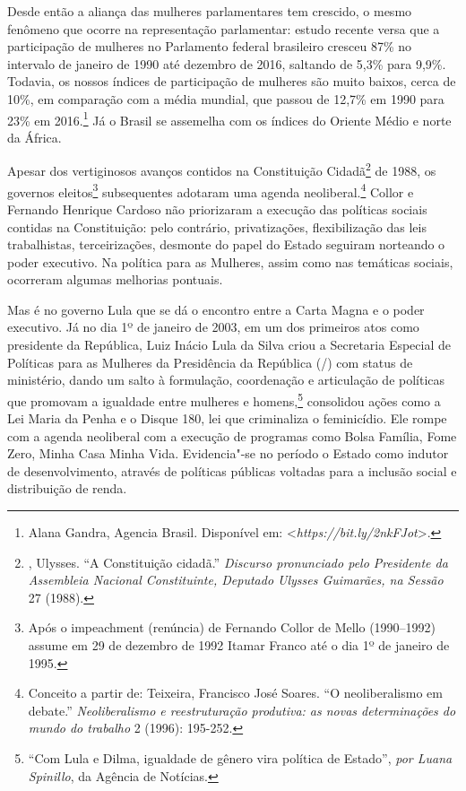 Desde então a aliança das mulheres parlamentares tem crescido, o mesmo
fenômeno que ocorre na representação parlamentar: estudo recente versa que a
participação de mulheres no Parlamento federal brasileiro cresceu 87\%
no intervalo de janeiro de 1990 até dezembro de 2016, saltando de 5,3\%
para 9,9\%. Todavia, os nossos índices de participação de mulheres são
muito baixos, cerca de 10\%, em comparação com a média mundial, que
passou de 12,7\% em 1990 para 23\% em 2016.\footnote{Alana Gandra,
  Agencia Brasil. Disponível em: \textless{}\emph{https://bit.ly/2nkFJot}\textgreater{}.}
Já o Brasil se assemelha com os índices do Oriente Médio e norte da África.

Apesar dos vertiginosos avanços contidos na Constituição Cidadã\footnote{,
  Ulysses. ``A Constituição cidadã.'' \emph{Discurso pronunciado pelo
  Presidente da Assembleia Nacional Constituinte, Deputado Ulysses
  Guimarães, na Sessão} 27 (1988).} de 1988, os governos
eleitos\footnote{Após o impeachment (renúncia) de Fernando Collor de Mello
  (1990--1992) assume em 29 de dezembro de 1992 Itamar Franco até o
  dia 1º de janeiro de 1995.}
subsequentes adotaram uma agenda neoliberal.\footnote{Conceito a partir de:
  Teixeira, Francisco José Soares. ``O neoliberalismo em
      debate.'' \emph{Neoliberalismo e reestruturação produtiva: as novas
  determinações do mundo do trabalho} 2 (1996): 195-252.} Collor e
Fernando Henrique Cardoso não priorizaram a execução das políticas
sociais contidas na Constituição: pelo contrário, privatizações,
flexibilização das leis trabalhistas, terceirizações, desmonte do papel
do Estado seguiram norteando o poder executivo. Na política para as
Mulheres, assim como nas temáticas sociais, ocorreram algumas melhorias
pontuais.

Mas é no governo Lula que se dá o encontro entre a Carta Magna e o poder
executivo. Já no dia 1º de janeiro de 2003, em um dos primeiros atos como
presidente da República, Luiz Inácio Lula da Silva criou
a Secretaria Especial de Políticas para as
Mulheres da Presidência da República (/) com status de ministério,
dando um salto à formulação, coordenação e articulação de políticas que
promovam a igualdade entre mulheres e homens,\footnote{``Com Lula e Dilma, igualdade de gênero vira política de Estado'', \emph{por Luana Spinillo}, da Agência  de
  Notícias.} consolidou ações como a Lei Maria da Penha
e o Disque 180, lei que criminaliza o feminicídio. Ele rompe com a
agenda neoliberal com a execução de programas como Bolsa Família, Fome
Zero, Minha Casa Minha Vida. Evidencia"-se no período o Estado como
indutor de desenvolvimento, através de políticas públicas voltadas para
a inclusão social e distribuição de renda.

